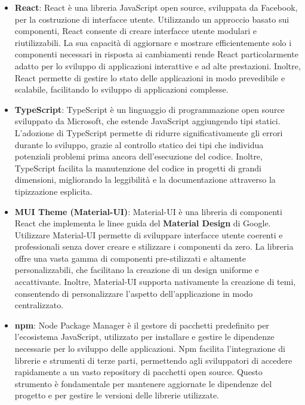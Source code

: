 \begin{itemize}
    \item \textbf{React}: React è una libreria JavaScript open source, sviluppata da Facebook, 
    per la costruzione di interfacce utente. Utilizzando un approccio basato sui componenti, 
    React consente di creare interfacce utente modulari e riutilizzabili. La sua capacità di 
    aggiornare e mostrare efficientemente solo i componenti necessari in risposta ai cambiamenti 
    rende React particolarmente adatto per lo sviluppo di applicazioni interattive e 
    ad alte prestazioni. Inoltre, React permette di gestire lo stato delle applicazioni in modo 
    prevedibile e scalabile, facilitando lo sviluppo di applicazioni complesse. 
    \cite{ReactWikipedia}
 
    \item \textbf{TypeScript}: TypeScript è un linguaggio di programmazione open source sviluppato 
    da Microsoft, che estende JavaScript aggiungendo tipi statici. 
    L'adozione di TypeScript permette di ridurre significativamente gli errori
    durante lo sviluppo, grazie al controllo statico dei tipi che individua potenziali
    problemi prima ancora dell'esecuzione del codice. Inoltre, TypeScript facilita la manutenzione 
    del codice in progetti di grandi dimensioni, migliorando la leggibilità e la documentazione attraverso
    la tipizzazione esplicita. \cite{TypescriptWikipedia}
 
    \item \textbf{MUI Theme (Material-UI)}: Material-UI è una libreria di componenti React 
    che implementa le linee guida del \textbf{Material Design} di Google. Utilizzare 
    Material-UI permette di sviluppare interfacce utente coerenti e professionali 
    senza dover creare e stilizzare i componenti da zero. La libreria offre una vasta 
    gamma di componenti pre-stilizzati e altamente personalizzabili, che facilitano la 
    creazione di un design uniforme e accattivante. Inoltre, Material-UI supporta nativamente 
    la creazione di temi, consentendo di personalizzare l'aspetto dell'applicazione in modo centralizzato.

    \item \textbf{npm}: Node Package Manager è il gestore di pacchetti predefinito 
    per l'ecosistema JavaScript, utilizzato per installare e 
    gestire le dipendenze necessarie per lo sviluppo delle applicazioni. 
    Npm facilita l'integrazione di librerie e strumenti di terze parti, 
    permettendo agli sviluppatori di accedere rapidamente a un vasto repository 
    di pacchetti open source. Questo strumento è fondamentale per mantenere 
    aggiornate le dipendenze del progetto e per gestire le versioni delle librerie utilizzate.

\end{itemize}

